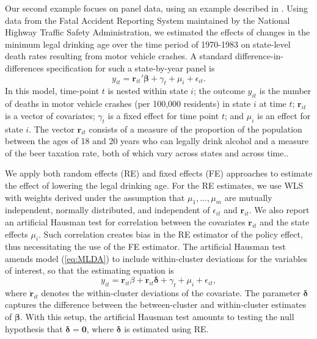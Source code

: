 \documentclass[12pt]{article}\usepackage[]{graphicx}\usepackage[]{color}
\newcommand{\bm}{\mathbf}
\newcommand{\bs}{\boldsymbol}
\begin{document}
Our second example focues on panel data, using an example described in \citet{Angrist2014mastering}.
Using data from the Fatal Accident Reporting System maintained by the National Highway Traffic Safety Administration, we estimated the effects of changes in the minimum legal drinking age over the time period of 1970-1983 on state-level death rates resulting from motor vehicle crashes.
A standard difference-in-differences specification for such a state-by-year panel is
\begin{equation}
\label{eq:MLDA}
y_{it} = \bm{r}_{it}'\bs\beta + \gamma_t + \mu_i + \epsilon_{it}.
\end{equation}
In this model, time-point $t$ is nested within state $i$; the outcome $y_{it}$ is the number of deaths in motor vehicle crashes (per 100,000 residents) in state $i$ at time $t$; $\bm{r}_{it}$ is a vector of covariates; $\gamma_t$ is a fixed effect for time point $t$; and $\mu_i$ is an effect for state $i$. The vector $\bm{r}_{it}$ consists of a measure of the proportion of the population between the ages of 18 and 20 years who can legally drink alcohol and a measure of the beer taxation rate, both of which vary across states and across time.. 

We apply both random effects (RE) and fixed effects (FE) approaches to estimate the effect of lowering the legal drinking age. 
For the RE estimates, we use WLS with weights derived under the assumption that  $\mu_1,...,\mu_m$ are mutually independent, normally distributed, and independent of $\epsilon_{it}$ and $\bm{r}_{it}$.
We also report an artificial Hausman test \citep{Arellano1993on, Wooldridge2002econometric} for correlation between the covariates $\bm{r}_{it}$ and the state effects $\mu_i$. Such correlation creates bias in the RE estimator of the policy effect, thus necessitating the use of the FE estimator.
The artificial Hausman test amends model (\ref{eq:MLDA}) to include within-cluster deviations for the variables of interest, so that the estimating equation is
\begin{equation}
y_{it} = \bm{r}_{it}\beta + \bm{\ddot{r}}_{it}\bs\delta + \gamma_t + \mu_i + \epsilon_{it},
\end{equation}
where $\bm{\ddot{r}}_{it}$ denotes the within-cluster deviations of the covariate.
The parameter $\bs\delta$ captures the difference between the between-cluster and within-cluster estimates of $\bs\beta$. 
With this setup, the artificial Hausman test amounts to testing the null hypothesis that $\bs\delta = \bm{0}$, where $\bs\delta$ is estimated using RE.  
\end{document}
